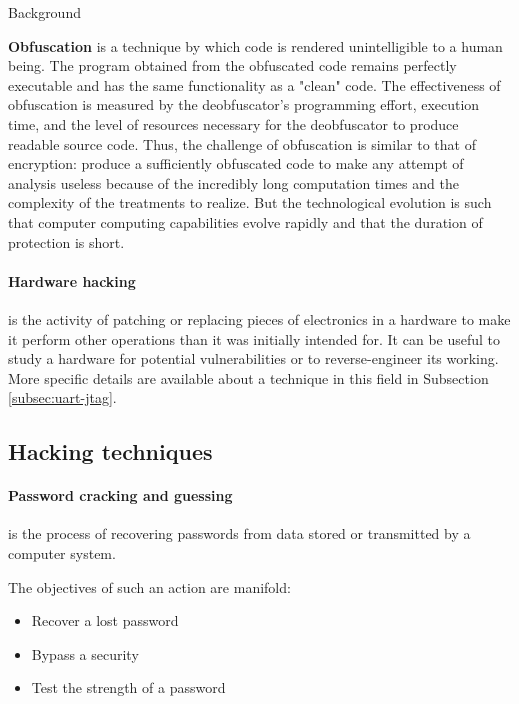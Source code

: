 \begin{chaptercover}{Background}
\begin{indentbox}{1cm}
\textbf{Obfuscation} is a technique by which code is rendered unintelligible to a human being. The program obtained from the obfuscated code remains perfectly executable and has the same functionality as a "clean" code.  The effectiveness of obfuscation is measured by the deobfuscator's programming effort, execution time, and the level of resources necessary for the deobfuscator to produce readable source code. Thus, the challenge of obfuscation is similar to that of encryption: produce a sufficiently obfuscated code to make any attempt of analysis useless because of the incredibly long computation times and the complexity of the treatments to realize. But the technological evolution is such that computer computing capabilities evolve rapidly and that the duration of protection is short.
\end{indentbox}

\paragraph{Hardware hacking} is the activity of patching or replacing pieces of electronics in a hardware to make it perform other operations than it was initially intended for. It can be useful to study a hardware for potential vulnerabilities or to reverse-engineer its working. More specific details are available about a technique in this field in Subsection \ref{subsec:uart-jtag}.


\subsection{Hacking techniques}\label{subsec:hacking-techniques}

\paragraph{Password cracking and guessing} is the process of recovering passwords from data stored or transmitted by a computer system.

\begin{indentbox}{1cm}
The objectives of such an action are manifold:
\begin{itemize}
  \item Recover a lost password
  \item Bypass a security
  \item Test the strength of a password
\end{itemize}


\end{indentbox}
\end{chaptercover}
